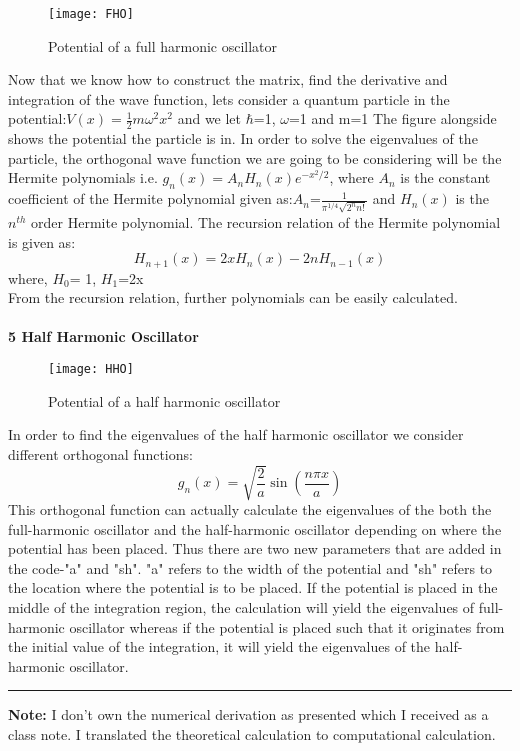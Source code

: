 \documentclass{article}
\begin{document}
\begin{wrapfigure}{r}{0.25\textwidth}
\texttt{[image: FHO]}
\caption{Potential of a full harmonic oscillator}
\end{wrapfigure}Now that we know how to construct the matrix, find the derivative and integration of the wave function, lets consider a quantum particle in the potential:$V(x)=\frac{1}{2}m\omega^2 x^2$ and we let $\hbar$=1, $\omega$=1 and m=1 The figure alongside shows the potential the particle is in. In order to solve the eigenvalues of the particle, the orthogonal wave function we are going to be considering will be the Hermite polynomials i.e. $g_n(x)=A_nH_n(x) e^{-x^2/2}$, where $A_n$ is the constant coefficient of the Hermite polynomial given as:$A_n$=$\frac{1}{\pi^{1/4}\sqrt{2^n n!}}$ and $H_n(x)$ is the $n^{th}$ order Hermite polynomial. The recursion relation of the Hermite polynomial is given as:
\begin{equation*}
H_{n+1}(x)=2xH_n(x)-2nH_{n-1}(x)
\end{equation*}
where,
$H_0$= 1, $H_1$=2x\\
From the recursion relation, further polynomials can be easily calculated.\\\\
{\huge \bf 5 Half Harmonic Oscillator}\\ \par
\begin{wrapfigure}{r}{0.25\textwidth}
\texttt{[image: HHO]}
\caption{Potential of a half harmonic oscillator}
\end{wrapfigure} In order to find the eigenvalues of the half harmonic oscillator we consider different orthogonal functions:
\begin{equation*}
g_n(x)=\sqrt{\frac{2}{a}}\sin \left (\frac{n\pi x}{a} \right ) 
\end{equation*}
This orthogonal function can actually calculate the eigenvalues of the both the full-harmonic oscillator and the half-harmonic oscillator depending on where the potential has been placed. Thus there are two new parameters that are added in the code-"a" and "sh". "a" refers to the width of the potential and "sh" refers to the location where the potential is to be placed. If the potential is placed in the middle of the integration region, the calculation will yield the eigenvalues of full-harmonic oscillator whereas if the potential is placed such that it originates from the initial value of the integration, it will yield the eigenvalues of the half-harmonic oscillator. 
\rule{19.2cm}{0.1cm}
{\bf Note:} I don't own the numerical derivation as presented which I received as a class note. I translated the theoretical calculation to computational calculation.
\end{document}
